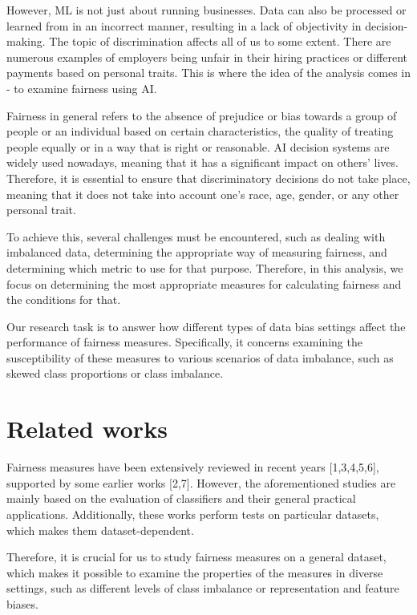 \documentclass[a4paper, 12pt]{article}
\begin{document}
However, ML is not just about running businesses. Data can also be processed or learned from in an incorrect manner, resulting in a lack of objectivity in decision-making. The topic of discrimination affects all of us to some extent. There are numerous examples of employers being unfair in their hiring practices or different payments based on personal traits. This is where the idea of the analysis comes in - to examine fairness using AI.

Fairness in general refers to the absence of prejudice or bias towards a group of people or an individual based on certain characteristics, the quality of treating people equally or in a way that is right or reasonable. AI decision systems are widely used nowadays, meaning that it has a significant impact on others' lives. Therefore, it is essential to ensure that discriminatory decisions do not take place, meaning that it does not take into account one's race, age, gender, or any other personal trait.

To achieve this, several challenges must be encountered, such as dealing with imbalanced data, determining the appropriate way of measuring fairness, and determining which metric to use for that purpose. Therefore, in this analysis, we focus on determining the most appropriate measures for calculating fairness and the conditions for that. 

Our research task is to answer how different types of data bias settings affect the performance of fairness measures. Specifically, it concerns examining the susceptibility of these measures to various scenarios of data imbalance, such as skewed class proportions or class imbalance.
 
\section{Related works}
\large
\bigbreak

Fairness measures have been extensively reviewed in recent years [1,3,4,5,6], supported by some earlier works [2,7]. However, the aforementioned studies are mainly based on the evaluation of classifiers and their general practical applications. Additionally, these works perform tests on particular datasets, which makes them dataset-dependent. 

Therefore, it is crucial for us to study fairness measures on a general dataset, which makes it possible to examine the properties of the measures in diverse settings, such as different levels of class imbalance or representation and feature biases. 
\end{document}
